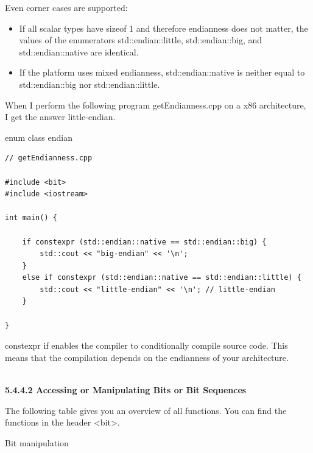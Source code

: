 Even corner cases are supported:

\begin{itemize}
\item 
If all scalar types have sizeof 1 and therefore endianness does not matter, the values of the enumerators std::endian::little, std::endian::big, and std::endian::native are identical.

\item 
If the platform uses mixed endianness, std::endian::native is neither equal to std::endian::big nor std::endian::little.
\end{itemize}

When I perform the following program getEndianness.cpp on a x86 architecture, I get the answer little-endian.

\noindent
enum class endian
\begin{lstlisting}[style=styleCXX]
// getEndianness.cpp

#include <bit>
#include <iostream>

int main() {
	
	if constexpr (std::endian::native == std::endian::big) {
		std::cout << "big-endian" << '\n';
	}
	else if constexpr (std::endian::native == std::endian::little) {
		std::cout << "little-endian" << '\n'; // little-endian
	}

}
\end{lstlisting}

constexpr if enables the compiler to conditionally compile source code. This means that the compilation depends on the endianness of your architecture.

\hspace*{\fill} \\ %
\noindent
\textbf{5.4.4.2\hspace{0.2cm} Accessing or Manipulating Bits or Bit Sequences}

The following table gives you an overview of all functions. You can find the functions in the header <bit>.

\begin{center}
Bit manipulation
\end{center}

